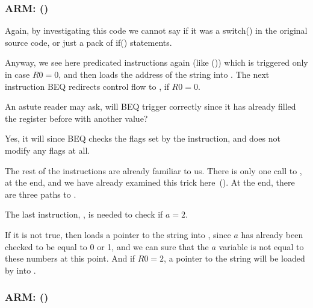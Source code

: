 \subsubsection{ARM: \OptimizingKeilVI (\ARMMode)}



Again, by investigating this code we cannot say if it was a switch() in the original source code, 
or just a pack of if() statements.


Anyway, we see here predicated instructions again (like \ADREQ ())
which is triggered only in case $R0=0$, and then loads the address of the string 
into .
The next instruction \ac{BEQ} redirects control flow to , if $R0=0$.

An astute reader may ask, will \ac{BEQ} trigger correctly since \ADREQ it
has already filled the  register before with another value?

Yes, it will since \ac{BEQ} checks the flags set by the \CMP instruction, 
and \ADREQ does not modify any flags at all.

The rest of the instructions are already familiar to us. 
There is only one call to \printf , at the end, and we have already examined this trick here~().
At the end, there are three paths to \printf{}.

The last instruction, , is needed to check if $a=2$.

If it is not true, then \ADRNE loads a pointer to the string 
into , since $a$ has already been checked to be equal to 0 or 1,
and we can sure that the $a$ variable is not equal to these numbers at this point.
And if $R0=2$, 
a pointer to the string 
will be loaded by \ADREQ into .

\subsubsection{ARM: \OptimizingKeilVI (\ThumbMode)}





